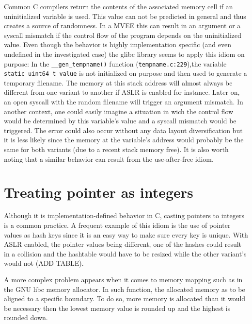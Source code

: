 \documentclass[english]{enstaPRE}
\begin{document}
Common C compilers return the contents of the associated memory cell if an uninitialized variable is used.
This value can not be predicted in general and thus creates a source of randomness. In a MVEE this can result in an argument or a syscall mismatch if the
control flow of the program depends on the uninitialized value.
Even though the behavior is highly implementation specific (and even undefined in the investigated case) the glibc library seems to apply 
this idiom on purpose: In the \texttt{\_\_gen\_tempname()} function (\texttt{tempname.c:229}),the variable \texttt{static uint64\_t value}
is not initialized on purpose and then used to generate a temporary filename.
The memory at this stack address will almost always be different from one variant to another if ASLR is enabled for instance.
Later on, an open syscall with the random filename will trigger an argument mismatch. In another context, one could easily imagine
a situation in wich the control flow would be determined by this variable’s value and a syscall mismatch would be triggered.
The error could also occur without any data layout diversification but it is less likely since the memory at the variable’s address would
probably be the same for both variants (due to a recent stack memory free).
It is also worth noting that a similar behavior can result from the use-after-free idiom. \\


\section{Treating pointer as integers}

Although it is implementation-defined behavior in C, casting pointers to integers is a common practice.
A frequent example of this idiom is the use of pointer values as hash keys since it is an easy way to make sure every key is unique. With ASLR enabled,
the pointer values being different, one of the hashes could result in a collision and the hashtable would have to be resized while
the other variant’s would not (ADD TABLE).

A more complex problem appears when it comes to memory mapping such as in the GNU libc memory allocator.
In such function, the allocated memory as to be aligned to a specific boundary. To do so, more memory is allocated than it would be 
necessary then the lowest memory value is rounded up and the highest is rounded down. \\
\end{document}
